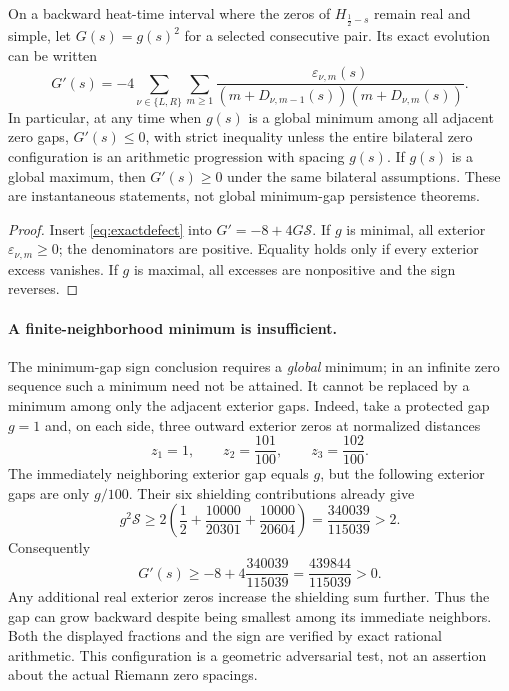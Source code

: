 \begin{corollary}
\label{cor:mingapantidiffusion}
On a backward heat-time interval where the
zeros of $H_{\frac12-s}$ remain real and simple,
let $G(s)=g(s)^2$ for a selected consecutive pair.
Its exact evolution can be written
\begin{equation}\label{eq:exactgapflow}
\boxed{
G'(s)=-4\sum_{\nu\in\{L,R\}}\sum_{m\ge1}
\frac{\varepsilon_{\nu,m}(s)}
{(m+D_{\nu,m-1}(s))(m+D_{\nu,m}(s))}.}
\end{equation}
In particular, at any time when $g(s)$ is a
global minimum among all adjacent zero gaps,
$G'(s)\le0$, with strict inequality unless the
entire bilateral zero configuration is an
arithmetic progression with spacing $g(s)$.
If $g(s)$ is a global maximum, then
$G'(s)\ge0$ under the same bilateral assumptions.
These are instantaneous statements, not
global minimum-gap persistence theorems.
\end{corollary}
\begin{proof}
Insert \eqref{eq:exactdefect} into
$G'=-8+4G\mathcal S$.
If $g$ is minimal, all exterior
$\varepsilon_{\nu,m}\ge0$; the denominators
are positive. Equality holds only if every
exterior excess vanishes. If $g$ is maximal,
all excesses are nonpositive and the sign reverses.
\end{proof}

\paragraph{A finite-neighborhood minimum is insufficient.}
The minimum-gap sign conclusion requires a \emph{global}
minimum; in an infinite zero sequence such a minimum
need not be attained. It cannot be replaced by a
minimum among only the adjacent exterior gaps.
Indeed, take a protected gap $g=1$ and, on each side,
three outward exterior zeros at normalized
distances
\[
z_1=1,\qquad z_2=\frac{101}{100},
\qquad z_3=\frac{102}{100}.
\]
The immediately neighboring exterior gap equals $g$,
but the following exterior gaps are only $g/100$.
Their six shielding contributions already give
\[
g^2\mathcal S\ge
2\left(\frac12+\frac{10000}{20301}
+\frac{10000}{20604}\right)
=\frac{340039}{115039}>2.
\]
Consequently
\[
G'(s)\ge-8+4\frac{340039}{115039}
=\frac{439844}{115039}>0.
\]
Any additional real exterior zeros increase the shielding
sum further. Thus the gap can grow backward despite being
smallest among its immediate neighbors. Both the displayed
fractions and the sign are verified by exact rational
arithmetic. This configuration is a geometric adversarial
test, not an assertion about the actual Riemann zero spacings.

